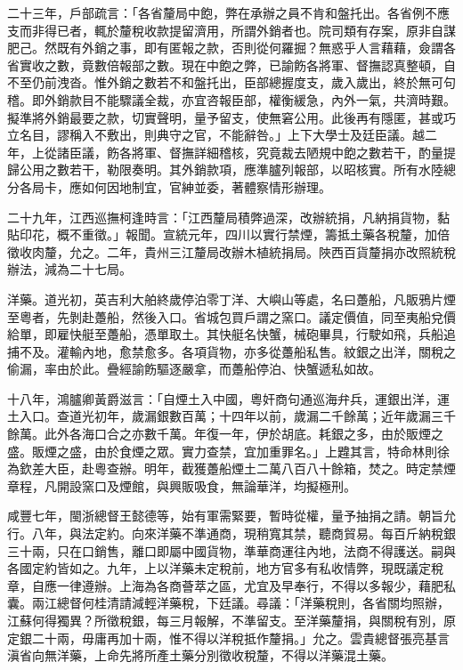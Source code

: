 \begin{pinyinscope}
二十三年，戶部疏言：「各省釐局中飽，弊在承辦之員不肯和盤托出。各省例不應支而非得已者，輒於釐稅收款提留濟用，所謂外銷者也。院司類有存案，原非自謀肥己。然既有外銷之事，即有匿報之款，否則從何羅掘？無惑乎人言藉藉，僉謂各省實收之數，竟數倍報部之數。現在中飽之弊，已諭飭各將軍、督撫認真整頓，自不至仍前洩沓。惟外銷之數若不和盤托出，臣部總握度支，歲入歲出，終於無可句稽。即外銷款目不能驟議全裁，亦宜咨報臣部，權衡緩急，內外一氣，共濟時艱。擬準將外銷最要之款，切實聲明，量予留支，使無窘公用。此後再有隱匿，甚或巧立名目，謬稱入不敷出，則典守之官，不能辭咎。」上下大學士及廷臣議。越二年，上從諸臣議，飭各將軍、督撫詳細稽核，究竟裁去陋規中飽之數若干，酌量提歸公用之數若干，勒限奏明。其外銷款項，應準臚列報部，以昭核實。所有水陸總分各局卡，應如何因地制宜，官紳並委，著體察情形辦理。

二十九年，江西巡撫柯逢時言：「江西釐局積弊過深，改辦統捐，凡納捐貨物，黏貼印花，概不重徵。」報聞。宣統元年，四川以實行禁煙，籌抵土藥各稅釐，加倍徵收肉釐，允之。二年，貴州三江釐局改辦木植統捐局。陜西百貨釐捐亦改照統稅辦法，減為二十七局。

洋藥。道光初，英吉利大舶終歲停泊零丁洋、大嶼山等處，名曰躉船，凡販鴉片煙至粵者，先剝赴躉船，然後入口。省城包買戶謂之窯口。議定價值，同至夷船兌價給單，即雇快艇至躉船，憑單取土。其快艇名快蟹，械砲畢具，行駛如飛，兵船追捕不及。灌輸內地，愈禁愈多。各項貨物，亦多從躉船私售。紋銀之出洋，關稅之偷漏，率由於此。疊經諭飭驅逐嚴拿，而躉船停泊、快蟹遞私如故。

十八年，鴻臚卿黃爵滋言：「自煙土入中國，粵奸商句通巡海弁兵，運銀出洋，運土入口。查道光初年，歲漏銀數百萬；十四年以前，歲漏二千餘萬；近年歲漏三千餘萬。此外各海口合之亦數千萬。年復一年，伊於胡底。耗銀之多，由於販煙之盛。販煙之盛，由於食煙之眾。實力查禁，宜加重罪名。」上韙其言，特命林則徐為欽差大臣，赴粵查辦。明年，截獲躉船煙土二萬八百八十餘箱，焚之。時定禁煙章程，凡開設窯口及煙館，與興販吸食，無論華洋，均擬極刑。

咸豐七年，閩浙總督王懿德等，始有軍需緊要，暫時從權，量予抽捐之請。朝旨允行。八年，與法定約。向來洋藥不準通商，現稍寬其禁，聽商貿易。每百斤納稅銀三十兩，只在口銷售，離口即屬中國貨物，準華商運往內地，法商不得護送。嗣與各國定約皆如之。九年，上以洋藥未定稅前，地方官多有私收情弊，現既議定稅章，自應一律遵辦。上海為各商薈萃之區，尤宜及早奉行，不得以多報少，藉肥私囊。兩江總督何桂清請減輕洋藥稅，下廷議。尋議：「洋藥稅則，各省關均照辦，江蘇何得獨異？所徵稅銀，每三月報解，不準留支。至洋藥釐捐，與關稅有別，原定銀二十兩，毋庸再加十兩，惟不得以洋稅抵作釐捐。」允之。雲貴總督張亮基言滇省向無洋藥，上命先將所產土藥分別徵收稅釐，不得以洋藥混土藥。


\end{pinyinscope}
